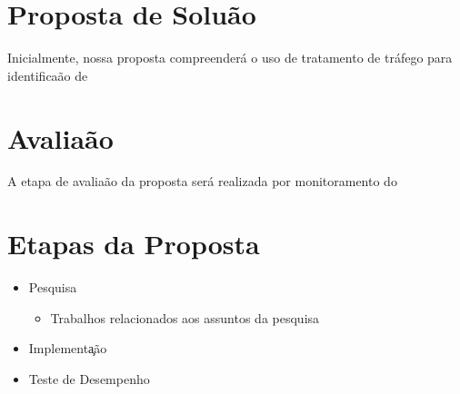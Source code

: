 \documentclass[a4paper, 11pt]{article}
\begin{document}
\section{Proposta de Solu\cc\~ao}
Inicialmente, nossa proposta compreender\'a o uso de tratamento de tr\'afego
para identifica\cc\~ao de 

\section{Avalia\cc\~ao}
A etapa de avalia\cc\~ao da proposta ser\'a realizada por monitoramento do 

\section{Etapas da Proposta}
\begin{itemize}
 \item Pesquisa
  \begin{itemize}
  \item Trabalhos relacionados aos assuntos da pesquisa
  \end{itemize}
 \item Implementa\c\cc\~ao
  \begin{itemize}
  \end{itemize}
 \item Teste de Desempenho 
  \begin{itemize}
  \end{itemize}
\end{itemize}


\newpage


\end{document}
